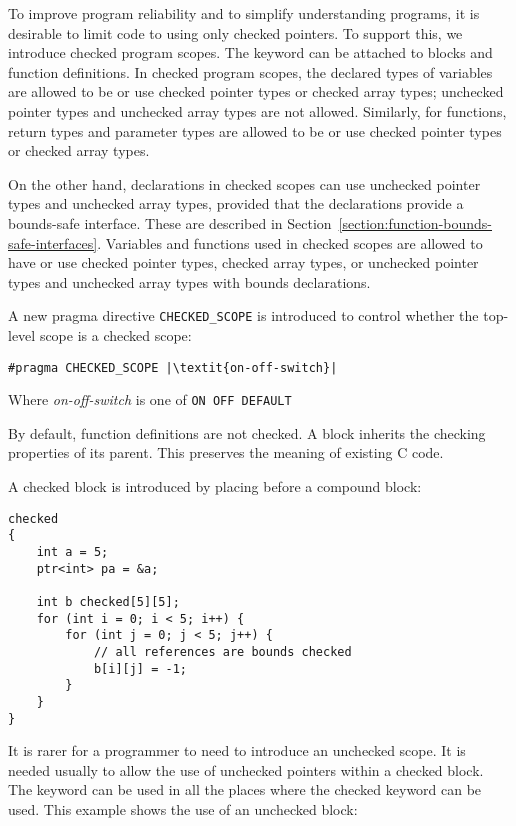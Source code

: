 To improve program reliability and to simplify understanding programs,
it is desirable to limit code to using only checked pointers. To support
this, we introduce checked program scopes. The  keyword
can be attached to blocks and function definitions. In checked program
scopes, the declared types of variables are allowed to be or use
checked pointer types or checked array types; unchecked pointer types
and unchecked array types are not allowed.  Similarly, for functions,
return types and parameter types are allowed to be or use checked pointer
types or checked array types.  

On the other hand,  declarations in checked scopes can use unchecked pointer
types and unchecked array types, provided that the declarations provide a
bounds-safe interface.   These are described in
Section~\ref{section:function-bounds-safe-interfaces}.
Variables and functions used in checked scopes are 
allowed to have or use checked pointer types, checked array types, or
unchecked pointer types and unchecked array types with bounds declarations.

A new pragma directive \lstinline|CHECKED_SCOPE| is introduced to control whether
the top-level scope is a checked scope:
\begin{lstlisting}[escapechar=\|]
#pragma CHECKED_SCOPE |\textit{on-off-switch}|
\end{lstlisting}

Where \textit{on-off-switch} is one of \lstinline|ON OFF DEFAULT|

By default, function definitions are not checked. A block inherits the
checking properties of its parent. This preserves the meaning of
existing C code.

A checked block is introduced by placing   before a
compound block:
\begin{lstlisting}
checked 
{
    int a = 5;
    ptr<int> pa = &a;

    int b checked[5][5];
    for (int i = 0; i < 5; i++) {
        for (int j = 0; j < 5; j++) {
            // all references are bounds checked
            b[i][j] = -1;
        }
    }
}
\end{lstlisting}

It is rarer for a programmer to need to introduce an unchecked scope. It
is needed usually to allow the use of unchecked pointers within a checked
block. The  keyword can be used in all the places where the
checked keyword can be used. This example shows the use of an unchecked
block:


